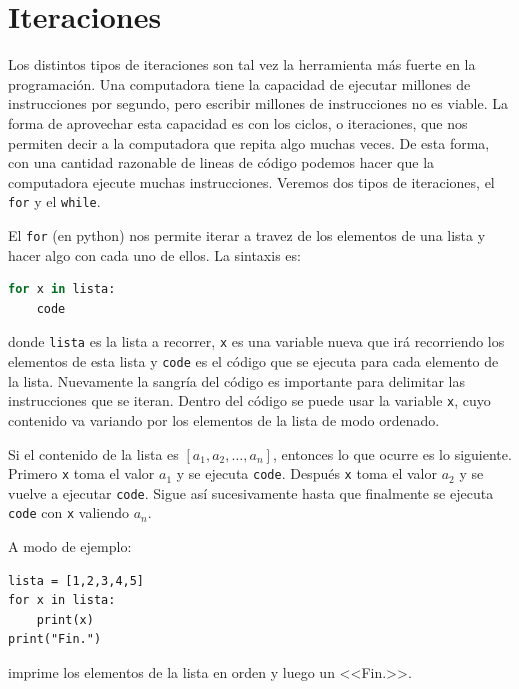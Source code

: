 \documentclass[a4paper, 12pt]{report}
\theoremstyle{definition}
\begin{document}
\section{Iteraciones}

Los distintos tipos de iteraciones son tal vez la herramienta más fuerte en la programación. Una computadora tiene la capacidad de ejecutar millones de instrucciones por segundo, pero escribir millones de instrucciones no es viable. La forma de aprovechar esta capacidad es con los ciclos, o iteraciones, que nos permiten decir a la computadora que repita algo muchas veces. De esta forma, con una cantidad razonable de lineas de código podemos hacer que la computadora ejecute muchas instrucciones. Veremos dos tipos de iteraciones, el {\tt for} y el {\tt while}.

El {\tt for} (en python) nos permite iterar a travez de los elementos de una lista y hacer algo con cada uno de ellos. La sintaxis es:
\begin{lstlisting}[language=python]
for x in lista:
    code
\end{lstlisting}
donde {\tt lista} es la lista a recorrer, {\tt x} es una variable nueva que irá recorriendo los elementos de esta lista y {\tt code} es el código que se ejecuta para cada elemento de la lista. Nuevamente la sangría del código es importante para delimitar las instrucciones que se iteran. Dentro del código se puede usar la variable {\tt x}, cuyo contenido va variando por los elementos de la lista de modo ordenado.

Si el contenido de la lista es $[a_1,a_2,\dots,a_n]$, entonces lo que ocurre es lo siguiente. Primero {\tt x} toma el valor $a_1$ y se ejecuta {\tt code}. Después {\tt x} toma el valor $a_2$ y se vuelve a ejecutar {\tt code}. Sigue así sucesivamente hasta que finalmente se ejecuta {\tt code} con {\tt x} valiendo $a_n$.

A modo de ejemplo:
\begin{verbatim}
lista = [1,2,3,4,5]
for x in lista:
    print(x)
print("Fin.")
\end{verbatim}
imprime los elementos de la lista en orden y luego un <<Fin.>>.
\end{document}
